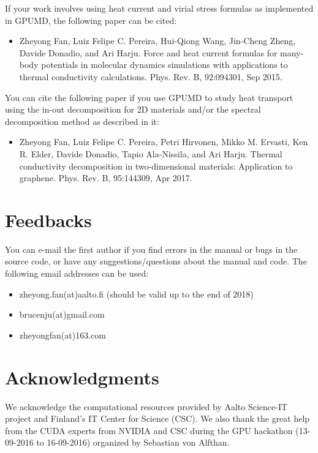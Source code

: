 \documentclass[12pt,a4paper]{report}
\begin{document}
If your work involves using heat current and virial stress formulas as implemented in GPUMD, the following paper can be cited:
\begin{itemize}
\item Zheyong Fan, Luiz Felipe C. Pereira, Hui-Qiong Wang, Jin-Cheng Zheng, Davide Donadio, and Ari Harju. Force and heat current formulas for many-body
potentials in molecular dynamics simulations with applications to thermal conductivity calculations. Phys. Rev. B, 92:094301, Sep 2015.
\end{itemize}

You can cite the following paper if you use GPUMD to study heat transport using the in-out decomposition for 2D materials and/or the spectral decomposition method as described in it:
\begin{itemize}
\item Zheyong Fan, Luiz Felipe C. Pereira, Petri Hirvonen, Mikko M. Ervasti, Ken R.
Elder, Davide Donadio, Tapio Ala-Nissila, and Ari Harju. Thermal conductivity
decomposition in two-dimensional materials: Application to graphene. Phys.
Rev. B, 95:144309, Apr 2017.
\end{itemize}

\section{Feedbacks}

You can e-mail the first author if you find errors in the manual or bugs in the source code, or have any suggestions/questions about the manual and code. The following email addresses can be used:
\begin{itemize}
\item zheyong.fan(at)aalto.fi (should be valid up to the end of 2018)
\item brucenju(at)gmail.com
\item zheyongfan(at)163.com
\end{itemize}


\section{Acknowledgments}
We acknowledge the computational resources provided by Aalto Science-IT project and Finland's IT Center for Science (CSC). We also thank the great help from the CUDA experts from NVIDIA and CSC during the GPU hackathon (13-09-2016 to 16-09-2016) organized by Sebastian von Alfthan.
\end{document}
